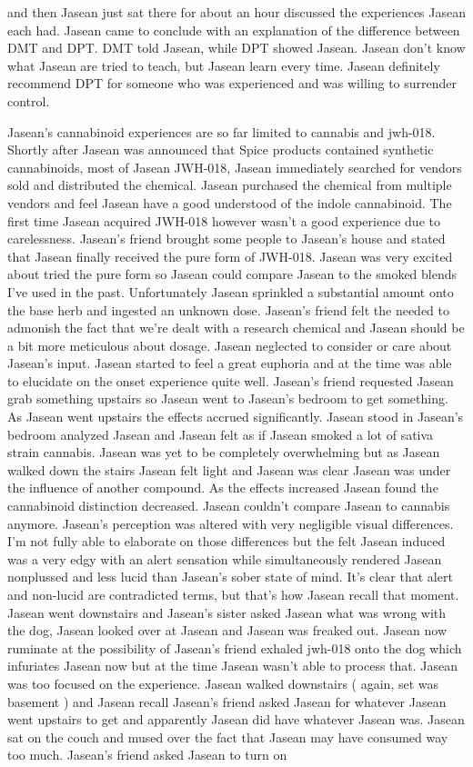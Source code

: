 \documentclass[12pt]{book}
\begin{document}
and then Jasean just sat there for about an hour discussed the experiences Jasean each had. Jasean came to conclude with an explanation of the difference between DMT and DPT. DMT told Jasean, while DPT showed Jasean. Jasean don't know what Jasean are tried to teach, but Jasean learn every time. Jasean definitely recommend DPT for someone who was experienced and was willing to surrender control.



Jasean's cannabinoid experiences are so far limited to cannabis and jwh-018. Shortly after Jasean was announced that Spice products contained synthetic cannabinoids, most of Jasean JWH-018, Jasean immediately searched for vendors sold and distributed the chemical. Jasean purchased the chemical from multiple vendors and feel Jasean have a good understood of the indole cannabinoid. The first time Jasean acquired JWH-018 however wasn't a good experience due to carelessness. Jasean's friend brought some people to Jasean's house and stated that Jasean finally received the pure form of JWH-018. Jasean was very excited about tried the pure form so Jasean could compare Jasean to the smoked blends I've used in the past. Unfortunately Jasean sprinkled a substantial amount onto the base herb and ingested an unknown dose. Jasean's friend felt the needed to admonish the fact that we're dealt with a research chemical and Jasean should be a bit more meticulous about dosage. Jasean neglected to consider or care about Jasean's input. Jasean started to feel a great euphoria and at the time was able to elucidate on the onset experience quite well. Jasean's friend requested Jasean grab something upstairs so Jasean went to Jasean's bedroom to get something. As Jasean went upstairs the effects accrued significantly. Jasean stood in Jasean's bedroom analyzed Jasean and Jasean felt as if Jasean smoked a lot of sativa strain cannabis. Jasean was yet to be completely overwhelming but as Jasean walked down the stairs Jasean felt light and Jasean was clear Jasean was under the influence of another compound. As the effects increased Jasean found the cannabinoid distinction decreased. Jasean couldn't compare Jasean to cannabis anymore. Jasean's perception was altered with very negligible visual differences. I'm not fully able to elaborate on those differences but the felt Jasean induced was a very edgy with an alert sensation while simultaneously rendered Jasean nonplussed and less lucid than Jasean's sober state of mind. It's clear that alert and non-lucid are contradicted terms, but that's how Jasean recall that moment. Jasean went downstairs and Jasean's sister asked Jasean what was wrong with the dog, Jasean looked over at Jasean and Jasean was freaked out. Jasean now ruminate at the possibility of Jasean's friend exhaled jwh-018 onto the dog which infuriates Jasean now but at the time Jasean wasn't able to process that. Jasean was too focused on the experience. Jasean walked downstairs ( again, set was basement ) and Jasean recall Jasean's friend asked Jasean for whatever Jasean went upstairs to get and apparently Jasean did have whatever Jasean was. Jasean sat on the couch and mused over the fact that Jasean may have consumed way too much. Jasean's friend asked Jasean to turn on 
\end{document}
